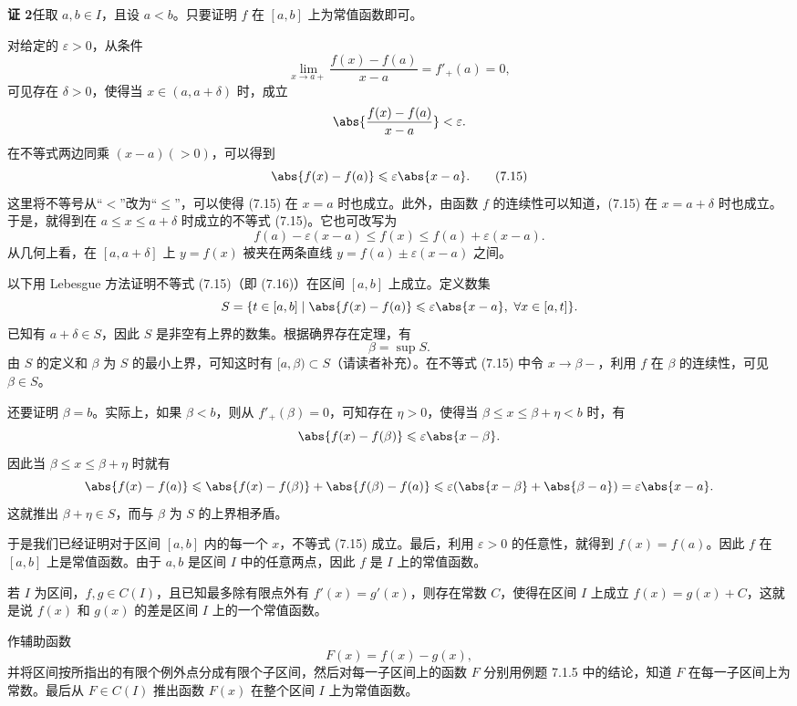 \begin{xproof}
\textbf{证 2}\quad 任取 $a,b\in I$，且设 $a<b$。只要证明 $f$ 在 $[a,b]$ 上为常值函数即可。

对给定的 $\varepsilon>0$，从条件
\[
  \lim_{x\to a+}\frac{f(x)-f(a)}{x-a}=f'_+(a)=0,
\]
可见存在 $\delta>0$，使得当 $x\in(a,a+\delta)$ 时，成立
\[
  \abs{\frac{f(x)-f(a)}{x-a}}<\varepsilon.
\]
在不等式两边同乘 $(x-a)(>0)$，可以得到
\begin{equation}
  \abs{f(x)-f(a)}\leqslant\varepsilon\abs{x-a}.
  \tag{7.15}
\end{equation}
这里将不等号从“$<$”改为“$\leqslant$”，可以使得 (7.15) 在 $x=a$ 时也成立。此外，由函数 $f$ 的连续性可以知道，(7.15) 在 $x=a+\delta$ 时也成立。于是，就得到在 $a\leqslant x\leqslant a+\delta$ 时成立的不等式 (7.15)。它也可改写为
\begin{equation}
  f(a)-\varepsilon(x-a)\leqslant f(x)\leqslant f(a)+\varepsilon(x-a).
  \tag{7.16}
\end{equation}
从几何上看，在 $[a,a+\delta]$ 上 $y=f(x)$ 被夹在两条直线 $y=f(a)\pm\varepsilon(x-a)$ 之间。

以下用 Lebesgue 方法证明不等式 (7.15)（即 (7.16)）在区间 $[a,b]$ 上成立。定义数集
\[
  S=\{t\in[a,b]\mid \abs{f(x)-f(a)}\leqslant\varepsilon\abs{x-a},\ \forall x\in[a,t]\}.
\]
已知有 $a+\delta\in S$，因此 $S$ 是非空有上界的数集。根据确界存在定理，有
\[
  \beta=\sup S.
\]
由 $S$ 的定义和 $\beta$ 为 $S$ 的最小上界，可知这时有 $[a,\beta)\subset S$（请读者补充）。在不等式 (7.15) 中令 $x\to\beta-$，利用 $f$ 在 $\beta$ 的连续性，可见 $\beta\in S$。

还要证明 $\beta=b$。实际上，如果 $\beta<b$，则从 $f'_+(\beta)=0$，可知存在 $\eta>0$，使得当 $\beta\leqslant x\leqslant\beta+\eta<b$ 时，有
\[
  \abs{f(x)-f(\beta)}\leqslant\varepsilon\abs{x-\beta}.
\]
因此当 $\beta\leqslant x\leqslant\beta+\eta$ 时就有
\[
  \abs{f(x)-f(a)}\leqslant\abs{f(x)-f(\beta)}+\abs{f(\beta)-f(a)}
  \leqslant\varepsilon(\abs{x-\beta}+\abs{\beta-a})
  =\varepsilon\abs{x-a}.
\]
这就推出 $\beta+\eta\in S$，而与 $\beta$ 为 $S$ 的上界相矛盾。

于是我们已经证明对于区间 $[a,b]$ 内的每一个 $x$，不等式 (7.15) 成立。最后，利用 $\varepsilon>0$ 的任意性，就得到 $f(x)=f(a)$。因此 $f$ 在 $[a,b]$ 上是常值函数。由于 $a,b$ 是区间 $I$ 中的任意两点，因此 $f$ 是 $I$ 上的常值函数。
\end{xproof}

\begin{xexample}[7.1.6（不定积分的基本定理）]
若 $I$ 为区间，$f,g\in C(I)$，且已知最多除有限点外有 $f'(x)=g'(x)$，则存在常数 $C$，使得在区间 $I$ 上成立 $f(x)=g(x)+C$，这就是说 $f(x)$ 和 $g(x)$ 的差是区间 $I$ 上的一个常值函数。
\end{xexample}
\begin{xproof}
作辅助函数
\[
  F(x)=f(x)-g(x),
\]
并将区间按所指出的有限个例外点分成有限个子区间，然后对每一子区间上的函数 $F$ 分别用例题 7.1.5 中的结论，知道 $F$ 在每一子区间上为常数。最后从 $F\in C(I)$ 推出函数 $F(x)$ 在整个区间 $I$ 上为常值函数。
\end{xproof}

